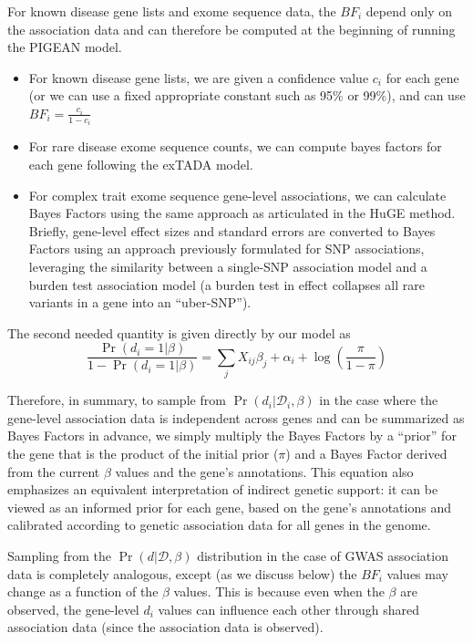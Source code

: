For known disease gene lists and exome sequence data, the $BF_i$
depend only on the association data and can therefore be computed at
the beginning of running the PIGEAN model.
\begin{itemize}
\item For known disease gene lists, we are given a confidence value
  $c_i$ for each gene (or we can use a fixed appropriate constant such as
  95\% or 99\%), and can use $BF_i = \frac{c_i}{1-c_i}$
\item For rare disease exome sequence counts, we can compute bayes
  factors for each gene following the exTADA model\cite{}.
\item For complex trait exome sequence gene-level associations, we
    can calculate Bayes Factors using the same approach as articulated
    in the HuGE method\cite{}. Briefly, gene-level effect sizes and
    standard errors are converted to Bayes Factors using an approach
    previously formulated for SNP associations, leveraging the
    similarity between a single-SNP association model and a burden
    test association model (a burden test in effect collapses all rare
    variants in a gene into an ``uber-SNP'').
\end{itemize}

The second needed quantity is given directly by our model as
\begin{equation}\frac{\Pr\left(d_i=1|\beta\right)}{1-\Pr\left(d_i=1|\beta\right)} = \sum_jX_{ij}\beta_j + \alpha_i +
\log\left(\frac{\pi}{1-\pi}\right)\label{eq:prior}
\end{equation}

Therefore, in summary, to sample from
$\Pr\left(d_i|\mathcal{D}_i,\beta\right)$ in the case where the
gene-level association data is independent across genes and can be
summarized as Bayes Factors in advance, we simply multiply the Bayes
Factors by a ``prior'' for the gene that is the product of the initial
prior ($\pi$) and a Bayes Factor derived from the current $\beta$
values and the gene's annotations. This equation also emphasizes an
equivalent interpretation of indirect genetic support: it can be
viewed as an informed prior for each gene, based on the gene's
annotations and calibrated according to genetic association data for
all genes in the genome.

Sampling from the
$\Pr\left(d|\mathcal{D},\beta\right)$ distribution
in the case of GWAS association data is completely analogous, except
(as we discuss below) the $BF_i$ values may change as a function of
the $\beta$ values. This is because even when the $\beta$ are
observed, the gene-level $d_i$ values can influence each other through
shared association data (since the association data is observed).

